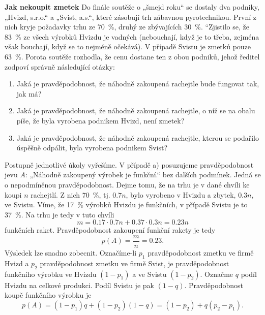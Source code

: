 \wikitextrule
\begin{example}\label{mai:exam058}
  \textbf{Jak nekoupit zmetek}\newline\small
    Do finále soutěže o „šmejd roku“ se dostaly dva podniky, „Hvizd, s.r.o.“ a „Svist, a.s.“, které 
    zásobují trh zábavnou pyrotechnikou. První z nich kryje požadavky trhu ze \SI{70}{\percent}, 
    druhý ze zbývajících \SI{30}{\percent}. “Zjistilo se, že \SI{83}{\percent} ze všech výrobků 
    Hvizdu je vadných (nebouchají, když je to třeba, zejména však bouchají, když se to
    nejméně očekává). V případě Svistu je zmetků pouze \SI{63}{\percent}. Porota soutěže rozhodla, 
    že cenu dostane ten z obou podniků, jehož ředitel zodpoví správně následující otázky:
    \begin{enumerate}
     \item Jaká je pravděpodobnost, že náhodně zakoupená rachejtle bude fungovat tak, jak má?
     \item Jaká je pravděpodobnost, že náhodně zakoupená rachejtle, o níž se na obalu píše, že byla 
     vyrobena podnikem Hvizd, není zmetek?
     \item Jaká je pravděpodobnost, že náhodně zakoupená rachejtle, kterou se podařilo úspěšně 
     odpálit, byla vyrobena podnikem Svist?
    \end{enumerate} 
    Postupně jednotlivé úkoly vyřešíme.
    V případě a) posuzujeme pravděpodobnost jevu \(A\): „Náhodně zakoupený výrobek je funkční.“ bez 
    dalších podmínek. Jedná se o nepodmíněnou pravděpodobnost. Dejme tomu, že na trhu je v dané 
    chvíli ke koupi \(n\) rachejtlí. Z nich \SI{70}{\percent}, tj. \(\num{0.7}n\), bylo vyrobeno v 
    Hvizdu a zbytek, \(\num{0.3}n\), ve Svistu. Víme, že \SI{17}{\percent} výrobků Hvizdu je 
    funkčních, v případě Svistu je to \SI{37}{\percent}. Na trhu je tedy v tuto chvíli
    \begin{equation*}
      m = \num{0.17}\cdot\num{0.7}n + \num{0.37}\cdot\num{0.3}n = \num{0.23}n
    \end{equation*}
    funkčních raket. Pravděpodobnost zakoupení funkční rakety je tedy
    \begin{equation*}
      p(A) = \dfrac{m}{n} = \num{0.23}.
    \end{equation*}
    Výsledek lze snadno zobecnit. Označíme-li \(p_1\) pravděpodobnost zmetku ve firmě Hvizd a 
    \(p_2\) pravděpodobnost zmetku ve firmě Svist, je pravděpodobnost funkčního výrobku ve Hvizdu 
    \((1 - p_1)\) a ve Svistu \((1 - p_2)\). Označme \(q\) podíl Hvizdu na celkové produkci. Podíl 
    Svistu je pak \((1 - q)\). Pravděpodobnost koupě funkčního výrobku je
    \begin{equation*}
      p(A) = (1 - p_1)q + (1 - p_2)(1 - q) = (1 - p_2) + q(p_2 - p_1).
    \end{equation*}
    

\end{example}
